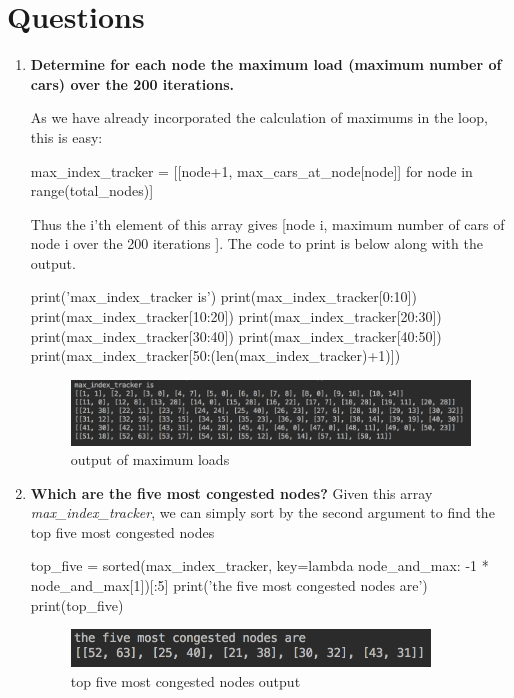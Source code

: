 \documentclass[paper=a4, fontsize=12pt]{scrartcl} %
\numberwithin{equation}{section}       %
\numberwithin{figure}{section}         %
\numberwithin{table}{section}          %
\begin{document}
\section{Questions}
\begin{enumerate}
\item \textbf{Determine for each node the maximum load (maximum number of cars) over the 200 iterations.}
\newline

As we have already incorporated the calculation of maximums in the loop, this is easy:

\begin{python}
max_index_tracker = [[node+1, max_cars_at_node[node]]
                         for node in range(total_nodes)]
\end{python}

Thus the i'th element of this array gives [node i, maximum number of cars of node i over the 200 iterations ]. The code to print is below along with the output.

\begin{python}
print('max_index_tracker is')
print(max_index_tracker[0:10])
print(max_index_tracker[10:20])
print(max_index_tracker[20:30])
print(max_index_tracker[30:40])
print(max_index_tracker[40:50])
print(max_index_tracker[50:(len(max_index_tracker)+1)])
\end{python}

\begin{figure}[h]
\caption{output of maximum loads}
\centering
\includegraphics[width=1.1\textwidth]{max_index.png}
\end{figure}

\item \textbf{Which are the five most congested nodes?} \newline
Given this array \textit{max\_index\_tracker}, we can simply sort by the second argument to find the top five most congested nodes
\begin{python}
top_five = sorted(max_index_tracker,
                      key=lambda node_and_max: -1 * node_and_max[1])[:5]
print('the five most congested nodes are')
print(top_five)
\end{python}

\begin{figure}[h]
\caption{top five most congested nodes output}
\centering
\includegraphics[width=0.9\textwidth]{top_five.png}
\end{figure}


\end{enumerate}
\end{document}

